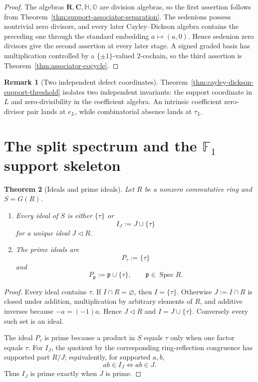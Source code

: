 \documentclass[11pt]{amsart}
\numberwithin{equation}{section}
\newtheorem{theorem}{Theorem}[section]
\theoremstyle{definition}
\newtheorem{remark}[theorem]{Remark}
\newcommand{\R}{\mathbf R}
\newcommand{\C}{\mathbf C}
\newcommand{\Spec}{\operatorname{Spec}}
\begin{document}
\begin{proof}
The algebras $\R,\C,\mathbb H,\mathbb O$ are division algebras, so the
first assertion follows from
Theorem~\ref{thm:support-associator-separation}.  The sedenions possess
nontrivial zero divisors, and every later Cayley--Dickson algebra contains
the preceding one through the standard embedding $a\mapsto(a,0)$.  Hence
sedenion zero divisors give the second assertion at every later stage.
A signed graded basis has multiplication controlled by a
$\{\pm1\}$-valued $2$-cochain, so the third assertion is
Theorem~\ref{thm:associator-cocycle}.
\end{proof}

\begin{remark}[Two independent defect coordinates]
Theorem~\ref{thm:cayley-dickson-support-threshold} isolates two independent
invariants: the support coordinate in $L$ and zero-divisibility in the
coefficient algebra.  An intrinsic coefficient zero-divisor pair lands at
$e_L$, while combinatorial absence lands at $\tau_L$.
\end{remark}

\section{The split spectrum and the \texorpdfstring{$\mathbb F_1$}{F1} support skeleton}

\begin{theorem}[Ideals and prime ideals]\label{thm:prime-classification}
Let $R$ be a nonzero commutative ring and $S=G(R)$.
\begin{enumerate}[label=\textup{(\alph*)}]
\item Every ideal of $S$ is either $\{\tau\}$ or
\[
I_J:=J\cup\{\tau\}
\]
for a unique ideal $J\triangleleft R$.
\item The prime ideals are
\[
P_\tau:=\{\tau\}
\]
and
\[
P_{\mathfrak p}:=\mathfrak p\cup\{\tau\},
\qquad
\mathfrak p\in\Spec R.
\]
\end{enumerate}
\end{theorem}

\begin{proof}
Every ideal contains $\tau$.  If $I\cap R=\varnothing$, then $I=\{\tau\}$.  Otherwise $J:=I\cap R$ is closed under addition, multiplication by arbitrary elements of $R$, and additive inverses because $-a=(-1)a$.  Hence $J\triangleleft R$ and $I=J\cup\{\tau\}$.  Conversely every such set is an ideal.

The ideal $P_\tau$ is prime because a product in $S$ equals $\tau$ only when one factor equals $\tau$.  For $I_J$, the quotient by the corresponding ring-reflection congruence has supported part $R/J$; equivalently, for supported $a,b$,
\[
ab\in I_J
\iff
ab\in J.
\]
Thus $I_J$ is prime exactly when $J$ is prime.
\end{proof}
\end{document}
